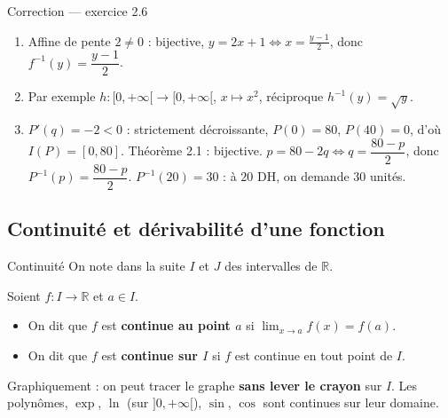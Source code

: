 \documentclass[aspectratio=169,11pt]{beamer}
\newcommand{\R}{\mathbb{R}}
\newcommand{\key}[1]{\textbf{\color{DarkBlue}#1}}
\newcommand{\important}[1]{\textbf{\color{DarkRed}#1}}
\newcommand{\fonc}[3]{#1\colon #2\to #3}
\begin{document}
\begin{frame}{Correction --- exercice 2.6}
	\begin{definitionbox}[Correction]
		\begin{enumerate}
			\item Affine de pente $2\neq 0$ : bijective, $y=2x+1\iff x=\frac{y-1}{2}$,
			donc $f^{-1}(y)=\dfrac{y-1}{2}$.
			\item Par exemple $\fonc{h}{[0,+\infty[}{[0,+\infty[}$, $x\longmapsto x^2$,
			réciproque $h^{-1}(y)=\sqrt{y}$.
			\item $P'(q)=-2<0$ : strictement décroissante, $P(0)=80$, $P(40)=0$,
			d'où $I(P)=[0,80]$. Théorème 2.1 : bijective.
			$p=80-2q\iff q=\dfrac{80-p}{2}$, donc $P^{-1}(p)=\dfrac{80-p}{2}$.
			$P^{-1}(20)=30$ : à $20$ DH, on demande $30$ unités.
		\end{enumerate}
	\end{definitionbox}
\end{frame}

\subsection{Continuité et dérivabilité d'une fonction}

\begin{frame}{Continuité}
	On note dans la suite $I$ et $J$ des intervalles de $\R$.
	\begin{definitionbox}
		Soient $\fonc{f}{I}{\R}$ et $a\in I$.
		\begin{itemize}
			\item On dit que $f$ est \key{continue au point $a$} si
			$\displaystyle\lim_{x\to a} f(x)=f(a)$.
			\item On dit que $f$ est \key{continue sur $I$} si $f$ est continue en tout point de $I$.
		\end{itemize}
	\end{definitionbox}
	\vspace{0.15cm}
	\begin{applicationbox}
		Graphiquement : on peut tracer le graphe \important{sans lever le crayon} sur $I$.
		Les polynômes, $\exp$, $\ln$ (sur $]0,+\infty[$), $\sin$, $\cos$ sont continues
		sur leur domaine.
	\end{applicationbox}
\end{frame}
\end{document}
